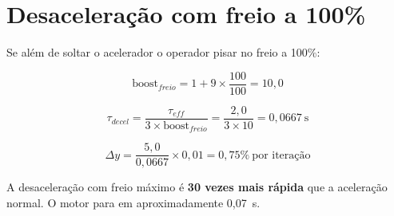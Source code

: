 \section*{Desaceleração com freio a 100\%}

Se além de soltar o acelerador o operador pisar no freio a 100\%:

\begin{equation*}
	\text{boost}_{freio} = 1 + 9 \times \frac{100}{100} = 10{,}0
\end{equation*}

\begin{equation*}
	\tau_{decel} = \frac{\tau_{eff}}{3 \times \text{boost}_{freio}} = \frac{2{,}0}{3 \times 10} = 0{,}0667~\text{s}
\end{equation*}

\begin{equation*}
	\Delta y = \frac{5{,}0}{0{,}0667} \times 0{,}01 = 0{,}75\%~\text{por iteração}
\end{equation*}

A desaceleração com freio máximo é \textbf{30 vezes mais rápida} que a aceleração normal. O motor para em aproximadamente 0,07~s.

